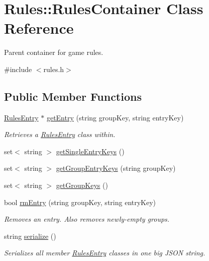 \hypertarget{class_rules_1_1_rules_container}{\section{Rules\-:\-:Rules\-Container Class Reference}
\label{class_rules_1_1_rules_container}
}


Parent container for game rules.  




{\ttfamily \#include $<$rules.\-h$>$}

\subsection*{Public Member Functions}
\begin{DoxyCompactItemize}
\item 
\hyperlink{class_rules_1_1_rules_entry}{Rules\-Entry} $\ast$ \hyperlink{class_rules_1_1_rules_container_a53aecfc2e5e4608210a3aa1a42a06733}{get\-Entry} (string group\-Key, string entry\-Key)
\begin{DoxyCompactList}\small\item\em Retrieves a \hyperlink{class_rules_1_1_rules_entry}{Rules\-Entry} class within. \end{DoxyCompactList}\item 
set$<$ string $>$ \hyperlink{class_rules_1_1_rules_container_af7d4181a8517b91c7ef647ae86fabd59}{get\-Single\-Entry\-Keys} ()
\item 
set$<$ string $>$ \hyperlink{class_rules_1_1_rules_container_ac50d947a7f420cc56eb1c675800af601}{get\-Group\-Entry\-Keys} (string group\-Key)
\item 
set$<$ string $>$ \hyperlink{class_rules_1_1_rules_container_ad2abd5e08329b09ade41a94522d5a422}{get\-Group\-Keys} ()
\item 
bool \hyperlink{class_rules_1_1_rules_container_a38996e8fcd4bb07301c47e8dd0fb8685}{rm\-Entry} (string group\-Key, string entry\-Key)
\begin{DoxyCompactList}\small\item\em Removes an entry. Also removes newly-\/empty groups. \end{DoxyCompactList}\item 
string \hyperlink{class_rules_1_1_rules_container_a933f0a5e2471bb618c00fb1a1986e6e5}{serialize} ()
\begin{DoxyCompactList}\small\item\em Serializes all member \hyperlink{class_rules_1_1_rules_entry}{Rules\-Entry} classes in one big J\-S\-O\-N string. \end{DoxyCompactList}\item 

\end{DoxyCompactItemize}

